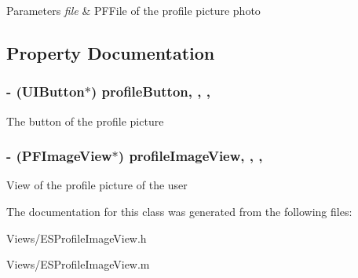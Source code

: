 \begin{DoxyParams}{Parameters}
{\em file} & P\+F\+File of the profile picture photo \\
\hline
\end{DoxyParams}


\subsection{Property Documentation}
\hypertarget{interface_e_s_profile_image_view_ac0bd65a60a59342cc29b74570cbfadb4}{}
\subsubsection[{profile\+Button}]{\setlength{\rightskip}{0pt plus 5cm}-\/ (U\+I\+Button$\ast$) profile\+Button\hspace{0.3cm}{\ttfamily [read]}, {\ttfamily [write]}, {\ttfamily [nonatomic]}, {\ttfamily [strong]}}\label{interface_e_s_profile_image_view_ac0bd65a60a59342cc29b74570cbfadb4}
The button of the profile picture \hypertarget{interface_e_s_profile_image_view_a2506bbcde458c718f22b3876b691eb73}{}
\subsubsection[{profile\+Image\+View}]{\setlength{\rightskip}{0pt plus 5cm}-\/ (P\+F\+Image\+View$\ast$) profile\+Image\+View\hspace{0.3cm}{\ttfamily [read]}, {\ttfamily [write]}, {\ttfamily [nonatomic]}, {\ttfamily [strong]}}\label{interface_e_s_profile_image_view_a2506bbcde458c718f22b3876b691eb73}
View of the profile picture of the user 

The documentation for this class was generated from the following files\+:\begin{DoxyCompactItemize}
\item 
Views/E\+S\+Profile\+Image\+View.\+h\item 
Views/E\+S\+Profile\+Image\+View.\+m\end{DoxyCompactItemize}
